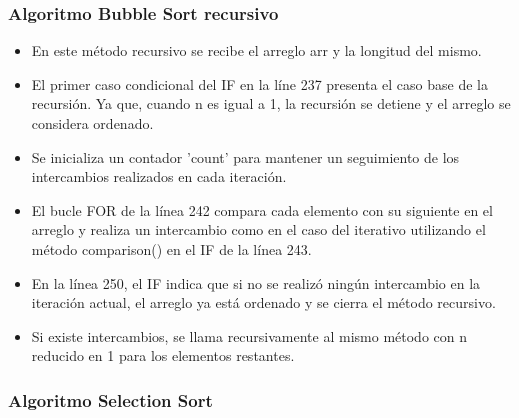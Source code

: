 \documentclass{article}
\begin{document}
    
    \subsubsection{Algoritmo Bubble Sort recursivo}
    
    
     
        \begin{itemize}	
            \item En este método recursivo se recibe el arreglo arr y la longitud del mismo.
            \item El primer caso condicional del IF en la líne 237 presenta el caso base de la recursión. Ya que, cuando n es igual a 1, la recursión se detiene y el arreglo se considera ordenado.
            \item Se inicializa un contador 'count' para mantener un seguimiento de los intercambios realizados en cada iteración.
            \item El bucle FOR de la línea 242 compara cada elemento con su siguiente en el arreglo y realiza un intercambio como en el caso del iterativo utilizando el método comparison() en el IF de la línea 243.
            \item En la línea 250, el IF indica que si no se realizó ningún intercambio en la iteración actual, el arreglo ya está ordenado y se cierra el método recursivo.
            \item Si existe intercambios, se llama recursivamente al mismo método con n reducido en 1 para los elementos restantes.
        \end{itemize}

        \subsubsection{Algoritmo Selection Sort}
        
        
        
\end{document}
